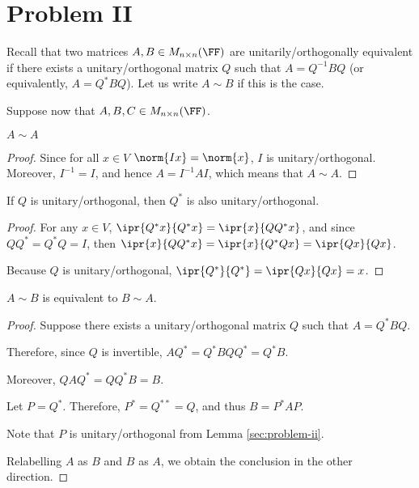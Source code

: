 \documentclass[11pt]{scrartcl}
\begin{document}
\section{Problem II}
Recall that two matrices $A,B \in M_{n \times n}(\FF)$ are unitarily/orthogonally equivalent if there exists a unitary/orthogonal matrix $Q$ such that $A = Q^{-1} B Q$ (or equivalently, $A = Q^* B Q$). Let us write $A \sim B$ if this is the case.

Suppose now that $A,B,C \in M_{n \times n}(\FF)$.

\begin{lemma}
$A\sim A$
\end{lemma}

\begin{proof}
  \hfill

  Since for all $x\in V$ $\norm{Ix} = \norm{x}$, $I$ is
  unitary/orthogonal. Moreover, $I^{-1} = I$, and hence
  $A = I^{-1}A I$, which means that $A\sim A$.
\end{proof}



\begin{lemma}
  \label{sec:problem-ii}
If $Q$ is unitary/orthogonal, then $Q^{*}$ is also unitary/orthogonal.
\end{lemma}

\begin{proof}
  \hfill

  For any $x\in V$, $\ipr{Q^{*}x}{Q^{*}x} = \ipr{x}{QQ^{*}x}$, and
  since $QQ^{*}=Q^{*}Q = I$, then
  $\ipr{x}{QQ^{*}x} = \ipr{x}{Q^{*}Qx} = \ipr{Qx}{Qx}$.

  Because $Q$ is unitary/orthogonal, $\ipr{Q^{*}}{Q^{*}} = \ipr{Qx}{Qx} = x$.
\end{proof}
\begin{lemma}
 $A \sim B$ is equivalent to $B \sim A$.
\end{lemma}

\begin{proof}
  \hfill

  Suppose there exists a unitary/orthogonal matrix $Q$ such that
  $A = Q^{*} B Q$.

  Therefore, since $Q$ is invertible,
  $A Q^{*} = Q^{*}BQQ^{*} = Q^{*}B$.

  Moreover, $QAQ^{*} = QQ^{*}B = B$.

  Let $P = Q^{*}$. Therefore, $P^{*}= Q^{**} = Q$, and thus
  $B = P^{*} A P$.

  Note that $P$ is unitary/orthogonal from Lemma \ref{sec:problem-ii}.

  Relabelling $A$ as $B$ and $B$ as $A$, we obtain the conclusion in the other direction.
\end{proof}
\end{document}
